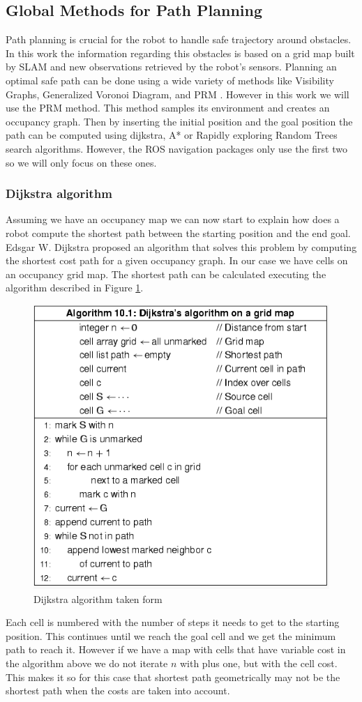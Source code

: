 \subsection{Global Methods for Path Planning}
Path planning is crucial for the robot to handle safe trajectory around obstacles. In this work the information regarding this obstacles is based on a grid map built by \ac{SLAM} and new observations retrieved by the robot's sensors.  Planning an optimal safe path can be done using a wide variety of methods like Visibility Graphs, Generalized Voronoi Diagram, and \ac{PRM} \cite{globalmethods}. However in this work we will use the \ac{PRM} method. This method samples its environment and creates an occupancy graph. Then by inserting the initial position and the goal position the path can be computed using dijkstra, A* or Rapidly exploring Random Trees search algorithms. However, the \ac{ROS} navigation packages only use the first two so  we will only focus on these ones.


\subsubsection{Dijkstra algorithm}\label{djk}
Assuming we have an occupancy map we can now start to explain how does a robot compute the shortest path between the starting position and the end goal. Edsgar W. Dijkstra proposed an algorithm that solves this problem by computing the shortest cost path for a given occupancy graph. In our case we have cells on an occupancy grid map. The shortest path can be calculated executing the algorithm described in Figure \ref{fig:dalg}. 
\begin{figure}[ht!] 
\centerline{\includegraphics [width=0.7 \textwidth]{imgs/chapter5/Dalg.png}}
\caption[Dijkstra algorithm]{Dijkstra algorithm taken form \cite{Ben-Ari2018}}
\label{fig:dalg}
\end{figure}
Each cell is numbered with the number of steps it needs to get to the starting position. This continues until we reach the goal cell and we get the minimum path to reach it. However if we have a map with cells that have variable cost in the algorithm above we do not iterate $n$ with plus one, but with the cell cost. This makes it so for this case that  shortest path geometrically may not be the shortest path when the costs are taken into account.

